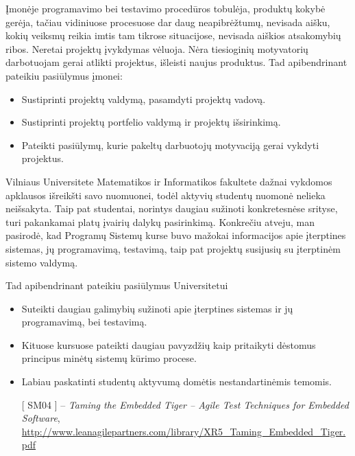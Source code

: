 \documentclass[12pt, a4paper, lithuanian, final]{article}
\begin{document}
Įmonėje programavimo bei testavimo procedūros tobulėja, produktų kokybė gerėja, tačiau vidiniuose procesuose dar daug neapibrėžtumų, nevisada aišku, kokių veiksmų reikia imtis tam tikrose situacijose, nevisada aiškios atsakomybių ribos.
Neretai projektų įvykdymas vėluoja.
Nėra tiesioginių motyvatorių darbotuojam gerai atlikti projektus, išleisti naujus produktus.
Tad apibendrinant pateikiu pasiūlymus įmonei:

\begin{itemize}
	\item Sustiprinti projektų valdymą, pasamdyti projektų vadovą.
	\item Sustiprinti projektų portfelio valdymą ir projektų išsirinkimą.
	\item Pateikti pasiūlymų, kurie pakeltų darbuotojų motyvaciją gerai vykdyti projektus.
\end{itemize}


Vilniaus Universitete Matematikos ir Informatikos fakultete dažnai vykdomos apklausos išreikšti savo nuomuonei, todėl aktyvių studentų nuomonė nelieka neišsakyta.
Taip pat studentai, norintys daugiau sužinoti konkretesnėse srityse, turi pakankamai platų įvairių dalykų pasirinkimą.
Konkrečiu atveju, man pasirodė, kad Programų Sistemų kurse buvo mažokai informacijos apie įterptines sistemas, jų programavimą, testavimą, taip pat projektų susijusių su įterptinėm sistemo valdymą.

Tad apibendrinant pateikiu pasiūlymus Universitetui
\begin{itemize}
	\item Suteikti daugiau galimybių sužinoti apie įterptines sistemas ir jų programavimą, bei testavimą.
	\item Kituose kursuose pateikti daugiau pavyzdžių kaip pritaikyti dėstomus principus minėtų sistemų kūrimo procese.
	\item Labiau paskatinti studentų aktyvumą domėtis nestandartinėmis temomis.
\end{itemize}






\begin{itemize}
	\item [[ SM04]] -- \textit{Taming the Embedded Tiger – Agile Test Techniques for Embedded Software}, \url{http://www.leanagilepartners.com/library/XR5_Taming_Embedded_Tiger.pdf}

\end{itemize}



\end{document}
